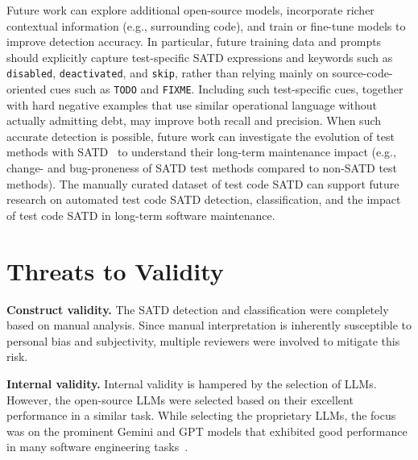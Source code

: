 Future work can explore additional open-source models, incorporate richer contextual information (e.g., surrounding code), and train or fine-tune models to improve detection accuracy. In particular, future training data and prompts should explicitly capture test-specific SATD expressions and keywords such as \texttt{disabled}, \texttt{deactivated}, and \texttt{skip}, rather than relying mainly on source-code-oriented cues such as \texttt{TODO} and \texttt{FIXME}. Including such test-specific cues, together with hard negative examples that use similar operational language without actually admitting debt, may improve both recall and precision. When such accurate detection is possible, future work can investigate the evolution of test methods with SATD~\cite{grund_codeshovel_2021, chowdhury_evidence_2025} to understand their long-term maintenance impact (e.g., change- and bug-proneness of SATD test methods compared to non-SATD test methods). The manually curated dataset of test code SATD can support future research on automated test code SATD detection, classification, and the impact of test code SATD in long-term software maintenance.




\section{Threats to Validity}\label{sec:threats}

\textbf{Construct validity.} The SATD detection and classification were completely based on manual analysis. Since manual interpretation is inherently susceptible to personal bias and subjectivity, multiple reviewers were involved to mitigate this risk.

\textbf{Internal validity.} Internal validity is hampered by the selection of LLMs. However, the open-source LLMs were selected based on their excellent performance in a similar task. While selecting the proprietary LLMs, the focus was on the prominent Gemini and GPT models that exhibited good performance in many software engineering tasks~\cite{batista2024code, bruni2025benchmarking, simoes2024evaluating}.



